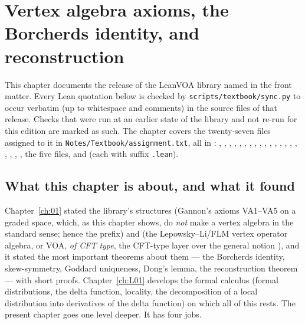\chapter[Vertex algebra axioms, Borcherds identity, reconstruction]{Vertex algebra axioms, the Borcherds identity, and reconstruction}\label{ch:L03}
\begingroup\setlength{\emergencystretch}{3em}

\providecommand{\lthreevac}{\mathbf{1}}
\providecommand{\lthreeV}{\mathcal{V}}
\providecommand{\lthreeY}{Y}
\providecommand{\lthreeBL}{B_{\mathrm L}}
\providecommand{\lthreeBR}{B_{\mathrm R}}
\providecommand{\lthreeD}{\partial}
\providecommand{\lthreeno}[1]{{:}#1{:}}

This chapter documents the release of the LeanVOA library named in the front matter. Every Lean quotation below is checked by \texttt{scripts/textbook/sync.py}
to occur verbatim (up to whitespace and comments) in the source files of that release. Checks that were run at an earlier state of the library and not re-run for this edition are marked as such. The chapter covers the twenty-seven files assigned to it in
\texttt{Notes/Textbook/assignment.txt}, all in :
, , , ,
, , , , ,
, , ,
, , , ,
, , ,
, the five  files, 
and  (each with suffix \texttt{.lean}).

\section[What this chapter is about]{What this chapter is about, and what it found}\label{l03:sec:intro}

Chapter~\ref{ch:01} stated the library's structures  (Gannon's axioms VA1--VA5 on a graded
space, which, as this chapter shows, do \emph{not} make a vertex algebra in the standard sense; hence the prefix) and
 (the Lepowsky--Li/FLM vertex operator algebra, or VOA, \emph{of CFT type}, the CFT-type
layer over the general notion ), and it stated the most important theorems about them --- the Borcherds identity,
skew-symmetry, Goddard uniqueness, Dong's lemma, the reconstruction theorem --- with short proofs.
Chapter~\ref{ch:L01} develops the formal calculus (formal distributions, the delta function,
locality, the decomposition of a local distribution into derivatives of the delta function) on
which all of this rests. The present chapter goes one level deeper. It has four jobs.

